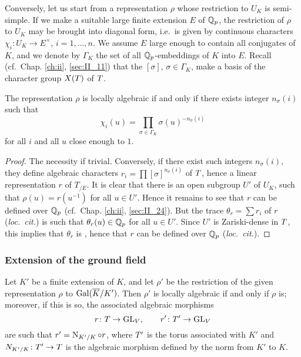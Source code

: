 Conversely, let us start from a representation $\rho$ whose restriction to $U_K$
is semi-simple. If we make a suitable large finite extension $E$ of $\mathbb{Q}_p$, the
restriction of $\rho$ to $U_K$ may be brought into diagonal form, i.e.\ is given
by continuous characters $\chi_i \colon U_K \to E^{\times}$, $i = 1,\dots,n$.
We assume $E$ large enough to contain all conjugates of $K$, and we denote by
$\Gamma_K$ the set of all $\mathbb{Q}_p$-embeddings\label{errata:Qp_embed} of $K$ into $E$.
Recall (cf.\ Chap. \ref{ch:ii}, \ref{sec:II_11}) that the $[\sigma]$,
$\sigma\in \Gamma_K$, make a basis of the character group $X(T)$ of $T$.

\begin{prop}\label{prop:III_11_2}
The representation $\rho$ is locally algebraic if and only if there exists
integer $n_\sigma(i)$ such that
\dpage
\[
	\chi_i(u) = \prod_{\sigma \in \Gamma_K} \sigma(u)^{-n_\sigma(i)}
\]
for all $i$ and all $u$ close enough to $1$.
\end{prop}
\begin{proof}
The necessity if trivial. Conversely, if there exist such integers
$n_\sigma(i)$, they define algebraic characters $r_i = \prod
[\sigma]^{n_\sigma(i)}$ of $T$, hence a linear representation $r$ of $T_{/E}$.
It is clear that there is an open subgroup $U'$ of $U_K$, such that $\rho(u) =
r(u^{-1})$ for all $u \in U'$. Hence it remains to see that $r$ can be defined
over $\mathbb{Q}_p$ (cf.\ Chap. \ref{ch:ii}, \ref{sec:II_24}). But the trace $\theta_r =
\sum r_i$ of $r$ (\emph{loc.\ cit.}) is such that $\theta_r(u) \in \mathbb{Q}_p$ for all $u
\in U'$. Since $U'$ is Zariski-dense in $T$, this implies that $\theta_r$ is
, hence that $r$ can be defined over $\mathbb{Q}_p$
(\emph{loc.\ cit.}).
\end{proof}
 
\subsubsection*{Extension of the ground field}
Let $K'$ be a finite extension of $K$, and let $\rho'$ be the restriction of the
given representation $\rho$ to $\operatorname{Gal}(\overline{K}/K')$. Then $\rho'$ is locally
algebraic if and only if
$\rho$ is; moreover, if this is so, the associated algebraic morphisms
\[
r \colon T \to \operatorname{GL}_V, \qquad r' \colon T' \to \operatorname{GL}_V
\]
are such that $r' = \operatorname{N}_{K'/K} \circ r$, where $T'$ is the
torus associated with $K'$ and $N_{K'/K} \colon T' \to T$ is the algebraic
morphism defined by the norm from $K'$ to $K$.

